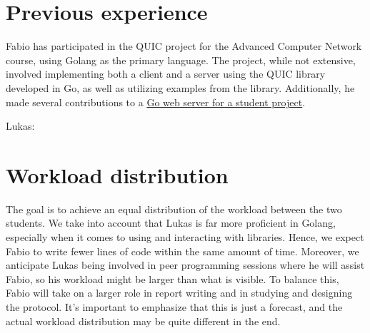 \documentclass[a4paper,english,10pt,NET]{tumarticle}
\begin{document}

\section{Previous experience}

Fabio has participated in the QUIC project for the Advanced Computer Network course, using Golang as the primary language. The project, while not extensive, involved implementing both a client and a server using the QUIC library developed in Go, as well as utilizing examples from the library. Additionally, he made several contributions to a \href{https://github.com/csunibo/polleg}{Go web server for a student project}.

Lukas:


\section{Workload distribution}

The goal is to achieve an equal distribution of the workload between the two students. We take into account that Lukas is far more proficient in Golang, especially when it comes to using and interacting with libraries. Hence, we expect Fabio to write fewer lines of code within the same amount of time. Moreover, we anticipate Lukas being involved in peer programming sessions where he will assist Fabio, so his workload might be larger than what is visible. To balance this, Fabio will take on a larger role in report writing and in studying and designing the protocol. It's important to emphasize that this is just a forecast, and the actual workload distribution may be quite different in the end.


\todos
\end{document}
